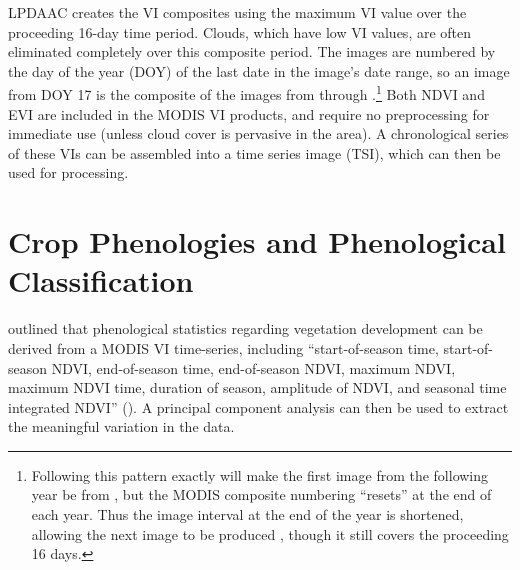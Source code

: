 LPDAAC creates the VI composites using the maximum VI value over the proceeding 16-day time period. Clouds, which have low VI values, are often eliminated completely over this composite period. The images are numbered by the day of the year (DOY) of the last date in the image's date range, so an image from DOY 17 is the composite of the images from  through .\footnote{Following this pattern exactly will make the first image from the following year be from , but the MODIS composite numbering ``resets'' at the end of each year. Thus the image interval at the end of the year is shortened, allowing the next image to be produced , though it still covers the proceeding 16 days.} Both NDVI and EVI are included in the MODIS VI products, and require no preprocessing for immediate use (unless cloud cover is pervasive in the area). A chronological series of these VIs can be assembled into a time series image (TSI), which can then be used for processing.


\section{Crop Phenologies and Phenological Classification}
\label{methods:phenology-fitting}

\citeauthor{gu2010phenological} outlined that phenological statistics regarding vegetation development can be derived from a MODIS VI time-series, including ``start-of-season time, start-of-season NDVI, end-of-season time, end-of-season NDVI, maximum NDVI, maximum NDVI time, duration of season, amplitude of NDVI, and seasonal time integrated NDVI'' \mkbibparens{\citeyear[529]{gu2010phenological}}. A principal component analysis can then be used to extract the meaningful variation in the data.

